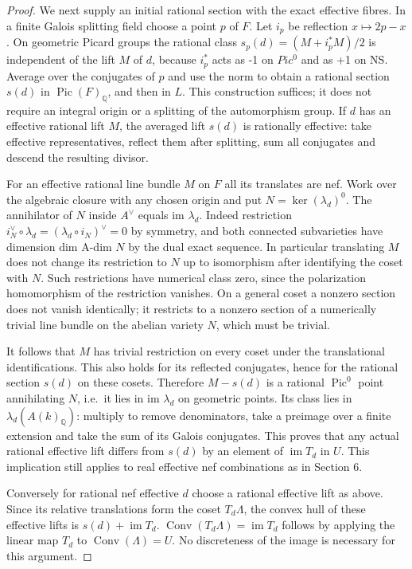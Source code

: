 \documentclass[11pt]{article}
\begin{document}
\begin{proof}
We next supply an initial rational section with the exact effective fibres. In a finite Galois splitting
field choose a point \(p\) of \(F\). Let \(i_p\) be reflection \(x\mapsto2p-x\). On geometric Picard
groups the rational class \(s_p(d)=(M+i_p^*M)/2\) is independent of the lift \(M\) of \(d\), because
\(i_p^*\) acts as -1 on \(Pic^0\) and as +1 on NS. Average over the conjugates of \(p\) and use the norm
to obtain a rational section \(s(d)\) in \(\operatorname{Pic}(F)_{\mathbb Q}\), and then in \(L\).
This construction suffices; it does not require an integral origin or a splitting of the automorphism
group. If \(d\) has an effective rational lift \(M\), the averaged lift \(s(d)\) is rationally
effective: take effective representatives, reflect them after splitting, sum all conjugates and descend
the resulting divisor.

For an effective rational line bundle \(M\) on \(F\) all its translates are nef. Work over the algebraic
closure with any chosen origin and put \(N=\ker(\lambda_d)^0\). The annihilator of \(N\) inside
\(A^\vee\) equals im \(\lambda_d\). Indeed restriction \(i_N^\vee \circ\lambda_d=(\lambda_d\circ
i_N)^\vee =0\) by symmetry, and both connected subvarieties have dimension dim A-dim \(N\) by the dual
exact sequence. In particular translating \(M\) does not change its restriction to \(N\) up to
isomorphism after identifying the coset with \(N\). Such restrictions have numerical class zero, since
the polarization homomorphism of the restriction vanishes. On a general coset a nonzero section does not
vanish identically; it restricts to a nonzero section of a numerically trivial line bundle on the abelian
variety \(N\), which must be trivial.

It follows that \(M\) has trivial restriction on every coset under the translational identifications.
This also holds for its reflected conjugates, hence for the rational section \(s(d)\) on these
cosets. Therefore \(M-s(d)\) is a rational \(\operatorname{Pic}^0\) point annihilating \(N\), i.e.~it lies in im
\(\lambda_d\) on geometric points. Its class lies in \(\lambda_d(A(k)_{\mathbb Q})\): multiply to
remove denominators, take a preimage over a finite extension and take the sum of its Galois conjugates.
This proves that any actual rational effective lift differs from \(s(d)\) by an element of \(\operatorname{im}T_d\)
in \(U\). This implication still applies to real effective nef combinations as in Section 6.

Conversely for rational nef effective \(d\) choose a rational effective lift as above. Since its relative
translations form the coset \(T_d\Lambda\), the convex hull of these effective lifts is
\(s(d)+\operatorname{im}T_d\). \(\operatorname{Conv}(T_d\Lambda)=\operatorname{im}T_d\) follows by applying the linear map \(T_d\)
to \(\operatorname{Conv}(\Lambda)=U\). No discreteness of the image is necessary for this argument.


\end{proof}
\end{document}
